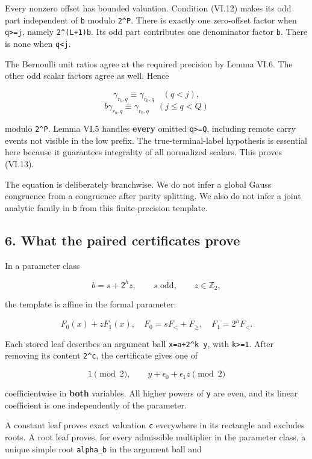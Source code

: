 \documentclass[11pt,letterpaper]{article}
\begin{document}
Every nonzero offset has bounded valuation. Condition (VI.12) makes its odd part independent of \texttt{b} modulo \texttt{2\^{}P}. There is exactly one zero-offset factor when \texttt{q\textgreater{}=j}, namely \texttt{2\^{}(L+1)b}. Its odd part contributes one denominator factor \texttt{b}. There is none when \texttt{q\textless{}j}.

The Bernoulli unit ratios agree at the required precision by Lemma VI.6. The other odd scalar factors agree as well. Hence

\[
\gamma_{r_b,q}\equiv\gamma_{r_0,q}\quad(q<j),
\] \[
b\gamma_{r_b,q}\equiv\gamma_{r_0,q}\quad(j\le q<Q)
\]

modulo \texttt{2\^{}P}. Lemma VI.5 handles \textbf{every} omitted \texttt{q\textgreater{}=Q}, including remote carry events not visible in the low prefix. The true-terminal-label hypothesis is essential here because it guarantees integrality of all normalized scalars. This proves (VI.13).

The equation is deliberately branchwise. We do not infer a global Gauss congruence from a congruence after parity splitting. We also do not infer a joint analytic family in \texttt{b} from this finite-precision template.

\subsection{6. What the paired certificates prove}\label{what-the-paired-certificates-prove}

In a parameter class

\[
b=s+2^h z,\qquad s\text{ odd},\qquad z\in\mathbb Z_2,
\]

the template is affine in the formal parameter:

\[
F_0(x)+zF_1(x),
\quad F_0=sF_<+F_{\ge},\quad F_1=2^hF_<.
\]

Each stored leaf describes an argument ball \texttt{x=a+2\^{}k\ y}, with \texttt{k\textgreater{}=1}. After removing its content \texttt{2\^{}c}, the certificate gives one of

\[
1\pmod2,
\qquad
 y+\epsilon_0+\epsilon_1z\pmod2
\tag{VI.14}
\]

coefficientwise in \textbf{both} variables. All higher powers of \texttt{y} are even, and its linear coefficient is one independently of the parameter.

A constant leaf proves exact valuation \texttt{c} everywhere in its rectangle and excludes roots. A root leaf proves, for every admissible multiplier in the parameter class, a unique simple root \texttt{alpha\_b} in the argument ball and
\end{document}
